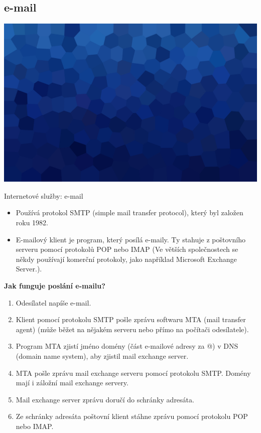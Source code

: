 \documentclass[aspectratio=169,xcolor=dvipsnames, t]{beamer}
\begin{document}
\subsection{e-mail}
{
    \includegraphics[width=\paperwidth,height=\paperheight]{AICStyleData/logos/mene_polygonu_bg.png}
}
\begin{frame}{Internetové služby: e-mail}
\vspace{-0.75cm}
\begin{itemize}
    \item Používá protokol SMTP (simple mail transfer protocol), který byl založen roku 1982.
    \item E-mailový klient je program, který posílá e-maily. Ty stahuje z poštovního serveru pomocí protokolů POP nebo IMAP (Ve větších společnostech se někdy používají komerční protokoly, jako například Microsoft Exchange Server.).
\end{itemize}
\textbf{\large{Jak funguje poslání e-mailu?}}
\begin{enumerate}
    \item Odesílatel napíše e-mail. 
    \item Klient pomocí protokolu SMTP pošle zprávu softwaru MTA (mail transfer agent) (může běžet na nějakém serveru nebo přímo na počítači odesílatele).
    \item Program MTA zjistí jméno domény (část e-mailové adresy za @) v DNS (domain name system), aby zjistil mail exchange server.
    \item MTA pošle zprávu mail exchange serveru pomocí protokolu SMTP. Domény mají i záložní mail exchange servery.
    \item Mail exchange server zprávu doručí do schránky adresáta.
    \item Ze schránky adresáta poštovní klient stáhne zprávu pomocí protokolu POP nebo IMAP. 
\end{enumerate}

\end{frame}
\end{document}
